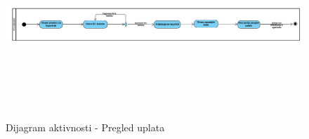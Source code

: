 \begin{figure}[H]
  \begin{center}
      \includegraphics[width=160mm, height=70mm]{Diagrams/dijagram_aktivnosti_pregled_uplata.png}
  \end{center}
  \caption {Dijagram aktivnosti - Pregled uplata}
  \label{activity_pregled_uplata}

\end{figure}
